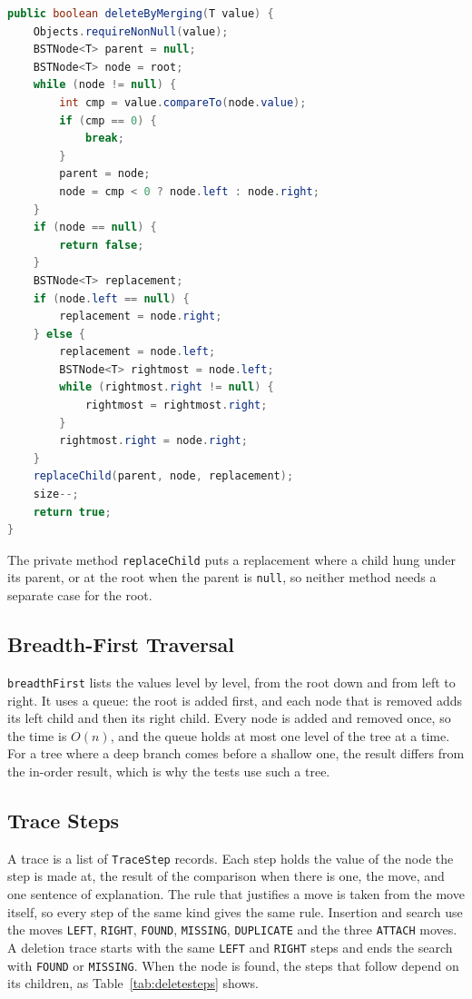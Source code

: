 \begin{lstlisting}[language=Java]
public boolean deleteByMerging(T value) {
    Objects.requireNonNull(value);
    BSTNode<T> parent = null;
    BSTNode<T> node = root;
    while (node != null) {
        int cmp = value.compareTo(node.value);
        if (cmp == 0) {
            break;
        }
        parent = node;
        node = cmp < 0 ? node.left : node.right;
    }
    if (node == null) {
        return false;
    }
    BSTNode<T> replacement;
    if (node.left == null) {
        replacement = node.right;
    } else {
        replacement = node.left;
        BSTNode<T> rightmost = node.left;
        while (rightmost.right != null) {
            rightmost = rightmost.right;
        }
        rightmost.right = node.right;
    }
    replaceChild(parent, node, replacement);
    size--;
    return true;
}
\end{lstlisting}

The private method \texttt{replaceChild} puts a replacement where a child hung under its parent, or at the root when the parent is \texttt{null}, so neither method needs a separate case for the root.

\subsection{Breadth-First Traversal}
\texttt{breadthFirst} lists the values level by level, from the root down and from left to right. It uses a queue: the root is added first, and each node that is removed adds its left child and then its right child. Every node is added and removed once, so the time is $O(n)$, and the queue holds at most one level of the tree at a time. For a tree where a deep branch comes before a shallow one, the result differs from the in-order result, which is why the tests use such a tree.

\subsection{Trace Steps}
A trace is a list of \texttt{TraceStep} records. Each step holds the value of the node the step is made at, the result of the comparison when there is one, the move, and one sentence of explanation. The rule that justifies a move is taken from the move itself, so every step of the same kind gives the same rule. Insertion and search use the moves \texttt{LEFT}, \texttt{RIGHT}, \texttt{FOUND}, \texttt{MISSING}, \texttt{DUPLICATE} and the three \texttt{ATTACH} moves. A deletion trace starts with the same \texttt{LEFT} and \texttt{RIGHT} steps and ends the search with \texttt{FOUND} or \texttt{MISSING}. When the node is found, the steps that follow depend on its children, as Table~\ref{tab:deletesteps} shows.

